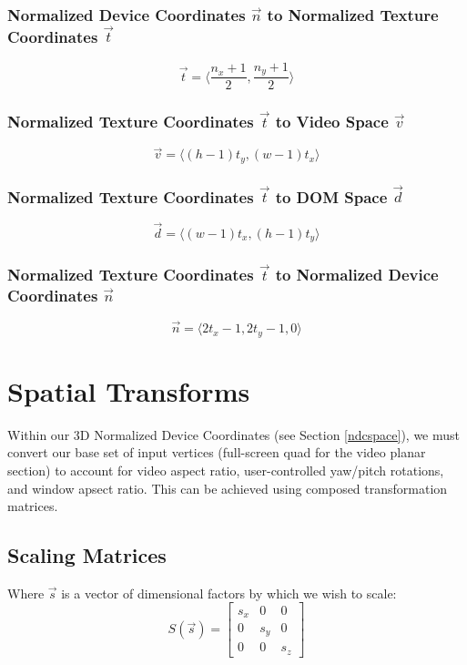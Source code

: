 \subsubsection{Normalized Device Coordinates $\vec{n}$ to Normalized Texture Coordinates $\vec{t}$}
\begin{equation}
    \vec{t} = \langle \frac{n_x + 1}{2}, \frac{n_y + 1}{2} \rangle
\end{equation}

\subsubsection{Normalized Texture Coordinates $\vec{t}$ to Video Space $\vec{v}$}
\begin{equation}
    \vec{v} = \langle (h-1)t_y, (w-1)t_x \rangle
\end{equation}

\subsubsection{Normalized Texture Coordinates $\vec{t}$ to DOM Space $\vec{d}$}
\begin{equation}
    \vec{d} = \langle (w-1)t_x, (h-1)t_y \rangle
\end{equation}

\subsubsection{Normalized Texture Coordinates $\vec{t}$ to Normalized Device Coordinates $\vec{n}$}
\begin{equation}
    \vec{n} = \langle 2t_x - 1, 2t_y - 1, 0 \rangle
\end{equation}


\section{Spatial Transforms}
Within our 3D Normalized Device Coordinates (see Section \ref{ndcspace}), we must convert our base set of input vertices (full-screen quad for the video planar section) to account for video aspect ratio, user-controlled yaw/pitch rotations, and window apsect ratio. This can be achieved using composed transformation matrices.\cite{xformmat}

\subsection{Scaling Matrices}
Where $\vec{s}$ is a vector of dimensional factors by which we wish to scale:
\begin{equation}
S(\vec{s}) =
\begin{bmatrix}
    s_{x} & 0 & 0 \\
    0 & s_{y} & 0 \\
    0 & 0 & s_{z}
\end{bmatrix}
\end{equation}

